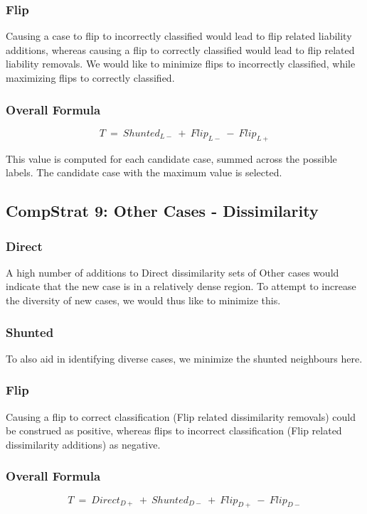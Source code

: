 \documentclass[a4paper,11pt]{report}
\begin{document}
\subsubsection{Flip}
Causing a case to flip to incorrectly classified would lead to flip related liability additions, whereas causing a flip to correctly classified would lead to flip related liability removals. We would like to minimize flips to incorrectly classified, while maximizing flips to correctly classified.

\subsubsection{Overall Formula}
\[  
  T~=~Shunted_{L-}~+~Flip_{L-}~-~Flip_{L+}
\]

This value is computed for each candidate case, summed across the possible labels. The candidate case with the maximum value is selected.

\subsection{CompStrat 9: Other Cases - Dissimilarity}

\subsubsection{Direct}
A high number of additions to Direct dissimilarity sets of Other cases would indicate that the new case is in a relatively dense region. To attempt to increase the diversity of new cases, we would thus like to minimize this.

\subsubsection{Shunted}
To also aid in identifying diverse cases, we minimize the shunted neighbours here.

\subsubsection{Flip}
Causing a flip to correct classification (Flip related dissimilarity removals) could be construed as positive, whereas flips to incorrect classification (Flip related dissimilarity additions) as negative.

\subsubsection{Overall Formula}
\[  
  T~=~Direct_{D+}~+~Shunted_{D-}~+~Flip_{D+}~-~Flip_{D-}
\]
\end{document}
